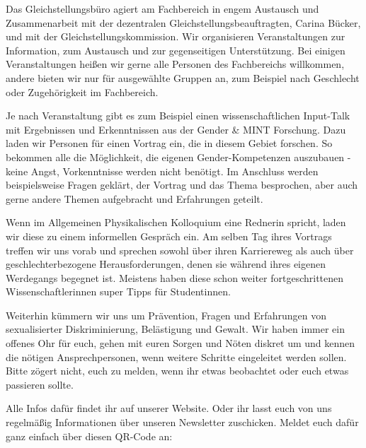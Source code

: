 \begin{multicols}{2}
Das Gleichstellungsbüro agiert am Fachbereich in engem Austausch und Zusammenarbeit mit der dezentralen Gleichstellungsbeauftragten, Carina Bücker, und mit der Gleichstellungskommission. Wir organisieren Veranstaltungen zur Information, zum Austausch und zur gegenseitigen Unterstützung. Bei einigen Veranstaltungen heißen wir gerne alle Personen des Fachbereichs willkommen, andere bieten wir nur für ausgewählte Gruppen an, zum Beispiel nach Geschlecht oder Zugehörigkeit im Fachbereich.

Je nach Veranstaltung gibt es zum Beispiel einen wissenschaftlichen Input-Talk mit Ergebnissen und Erkenntnissen aus der Gender \& MINT Forschung. Dazu laden wir Personen für einen Vortrag ein, die in diesem Gebiet forschen. So bekommen alle die Möglichkeit, die eigenen Gender-Kompetenzen auszubauen - keine Angst, Vorkenntnisse werden nicht benötigt. Im Anschluss werden beispielsweise Fragen geklärt, der Vortrag und das Thema besprochen, aber auch gerne andere Themen aufgebracht und Erfahrungen geteilt.

Wenn im Allgemeinen Physikalischen Kolloquium eine Rednerin spricht, laden wir diese zu einem informellen Gespräch ein. Am selben Tag ihres Vortrags treffen wir uns vorab und sprechen sowohl über ihren Karriereweg als auch über geschlechterbezogene Herausforderungen, denen sie während ihres eigenen Werdegangs begegnet ist. Meistens haben diese schon weiter fortgeschrittenen Wissenschaftlerinnen super Tipps für Studentinnen.

Weiterhin kümmern wir uns um Prävention, Fragen und Erfahrungen von sexualisierter Diskriminierung, Belästigung und Gewalt. Wir haben immer ein offenes Ohr für euch, gehen mit euren Sorgen und Nöten diskret um und kennen die nötigen Ansprechpersonen, wenn weitere Schritte eingeleitet werden sollen. Bitte zögert nicht, euch zu melden, wenn ihr etwas beobachtet oder euch etwas passieren sollte.

\begin{multicols}{2}
Alle Infos dafür findet ihr auf unserer \mbox{Website\footnotemark}. Oder ihr lasst euch von uns regelmäßig Informationen über unseren Newsletter zuschicken. Meldet euch dafür ganz einfach über diesen QR-Code an:
\end{multicols}


\end{multicols}
